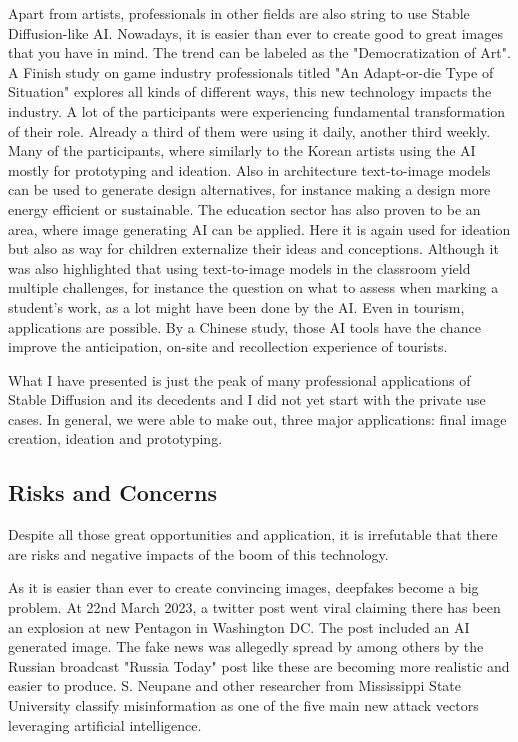 \documentclass[11pt]{article}
\begin{document}
Apart from artists, professionals in other fields are also string to use Stable Diffusion-like AI. Nowadays, it is easier than ever to create good to great images that you have in mind. The trend can be labeled as the "Democratization of Art". A Finish study on game industry professionals\cite{vimpari2023texttoimagegenerationaibygameprofessionals} titled "An Adapt-or-die Type of Situation" explores all kinds of different ways, this new technology impacts the industry. A lot of the participants were experiencing fundamental transformation of their role. Already a third of them were using it daily, another third weekly. Many of the participants, where similarly to the Korean artists using the AI mostly for prototyping and ideation. Also in architecture\cite{sekban2022artandarchtitecture} text-to-image models can be used to generate design alternatives, for instance making a design more energy efficient or sustainable. The education sector has also proven to be an area, where image generating AI can be applied\cite{vartiainen2023aiincraftseducation}. Here it is again used for ideation but also as way for children externalize their ideas and conceptions. Although it was also highlighted that using text-to-image models in the classroom yield multiple challenges, for instance the question on what to assess when marking a student's work, as a lot might have been done by the AI. Even in tourism, applications are possible. By a Chinese study\cite{miao2023aiintourism}, those AI tools have the chance improve the anticipation, on-site and recollection experience of tourists.

What I have presented is just the peak of many professional applications of Stable Diffusion and its decedents and I did not yet start with the private use cases. In general, we were able to make out, three major applications: final image creation, ideation and prototyping.

\subsection{Risks and Concerns}
Despite all those great opportunities and application, it is irrefutable that there are risks and negative impacts of the boom of this technology.

As it is easier than ever to create convincing images, deepfakes become a big problem. At 22nd March 2023, a twitter post went viral claiming there has been an explosion at new Pentagon in Washington DC. The post included an AI generated image. The fake news was allegedly spread by among others by the Russian broadcast "Russia Today"\cite{correctiv2023pentagonexplosion} post like these are becoming more realistic and easier to produce. S. Neupane and other researcher from Mississippi State University\cite{neupane2023impactsriskgenerativeai} classify misinformation as one of the five main new attack vectors leveraging artificial intelligence.
\end{document}
